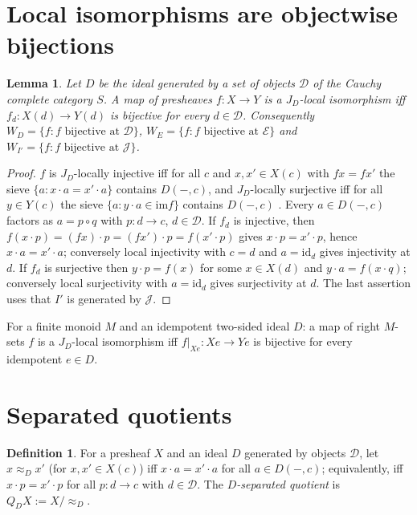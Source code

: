 \documentclass[11pt]{amsart}
\newtheorem{lem}[thm]{Lemma}
\theoremstyle{definition}
\newtheorem{defi}[thm]{Definition}
\newcommand{\im}{\mathrm{im}}
\newcommand{\sD}{\mathcal D}
\newcommand{\sE}{\mathcal E}
\newcommand{\sJ}{\mathcal J}
\begin{document}
\section{Local isomorphisms are objectwise bijections}\label{sec:objectwise}

\begin{lem}\label{lem:objectwise}
Let $D$ be the ideal generated by a set of objects $\sD$ of the Cauchy complete
category $S$. A map of presheaves $f\colon X\to Y$ is a $J_D$-local isomorphism
iff $f_d\colon X(d)\to Y(d)$ is bijective for every $d\in\sD$. Consequently
$W_D=\{f:f\text{ bijective at }\sD\}$, $W_E=\{f:f\text{ bijective at }\sE\}$
and $W_{I'}=\{f:f\text{ bijective at }\sJ\}$.
\end{lem}
\begin{proof}
$f$ is $J_D$-locally injective iff for all $c$ and $x,x'\in X(c)$ with
$fx=fx'$ the sieve $\{a:x\cdot a=x'\cdot a\}$ contains $D(-,c)$, and
$J_D$-locally surjective iff for all $y\in Y(c)$ the sieve
$\{a:y\cdot a\in\im f\}$ contains $D(-,c)$ \cite[III.7]{MLM}. Every
$a\in D(-,c)$ factors as $a=p\circ q$ with $p\colon d\to c$, $d\in\sD$. If
$f_d$ is injective, then $f(x\cdot p)=(fx)\cdot p=(fx')\cdot p=f(x'\cdot p)$
gives $x\cdot p=x'\cdot p$, hence $x\cdot a=x'\cdot a$; conversely local
injectivity with $c=d$ and $a=\mathrm{id}_d$ gives injectivity at $d$. If $f_d$
is surjective then $y\cdot p=f(x)$ for some $x\in X(d)$ and
$y\cdot a=f(x\cdot q)$; conversely local surjectivity with $a=\mathrm{id}_d$
gives surjectivity at $d$. The last assertion uses that $I'$ is generated by
$\sJ$.
\end{proof}

For a finite monoid $M$ and an idempotent two-sided ideal $D$: a map of right
$M$-sets $f$ is a $J_D$-local isomorphism iff $f|_{Xe}\colon Xe\to Ye$ is
bijective for every idempotent $e\in D$.

\section{Separated quotients}\label{sec:quotient}

\begin{defi}
For a presheaf $X$ and an ideal $D$ generated by objects $\sD$, let
$x\approx_Dx'$ (for $x,x'\in X(c)$) iff $x\cdot a=x'\cdot a$ for all
$a\in D(-,c)$; equivalently, iff $x\cdot p=x'\cdot p$ for all $p\colon d\to c$
with $d\in\sD$. The \emph{$D$-separated quotient} is $Q_DX:=X/{\approx_D}$.
\end{defi}
\end{document}

